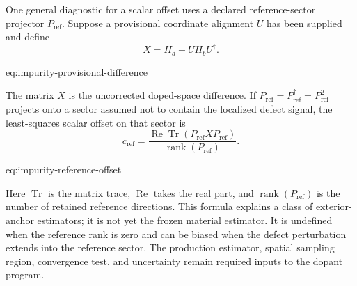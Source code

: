 One general diagnostic for a scalar offset uses a declared reference-sector
projector $P_{\mathrm{ref}}$. Suppose a provisional coordinate alignment $U$
has been supplied and define
\begin{equation}
    X=H_d-UH_bU^{\dagger}.
    \label{eq:impurity-provisional-difference}
\end{equation}
\begin{equationterms}{eq:impurity-provisional-difference}
\end{equationterms}
The matrix $X$ is the uncorrected doped-space difference. If
$P_{\mathrm{ref}}=P_{\mathrm{ref}}^{\dagger}=P_{\mathrm{ref}}^2$ projects onto
a sector assumed not to contain the localized defect signal, the least-squares
scalar offset on that sector is
\begin{equation}
    c_{\mathrm{ref}}
    =
    \frac{\operatorname{Re}\operatorname{Tr}
    (P_{\mathrm{ref}}XP_{\mathrm{ref}})}
    {\operatorname{rank}(P_{\mathrm{ref}})}.
    \label{eq:impurity-reference-offset}
\end{equation}
\begin{equationterms}{eq:impurity-reference-offset}
\end{equationterms}
Here $\operatorname{Tr}$ is the matrix trace, $\operatorname{Re}$ takes the real
part, and $\operatorname{rank}(P_{\mathrm{ref}})$ is the number of retained
reference directions. This formula explains a class of exterior-anchor
estimators; it is not yet the frozen material estimator. It is undefined when
the reference rank is zero and can be biased when the defect perturbation
extends into the reference sector. The production estimator, spatial sampling
region, convergence test, and uncertainty remain required inputs to the dopant
program.

